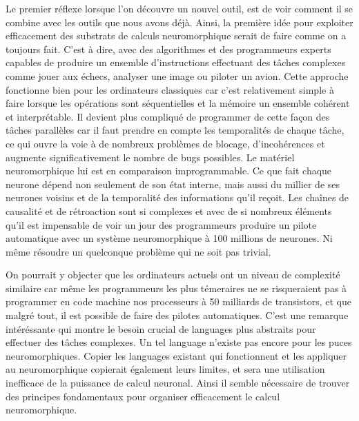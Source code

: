 	Le premier réflexe lorsque l'on découvre un nouvel outil, est de voir comment il se combine avec les outils que nous avons déjà. Ainsi, la première idée pour exploiter efficacement des substrats de calculs neuromorphique serait de faire comme on a toujours fait. C'est à dire, avec des algorithmes et des programmeurs experts capables de produire un ensemble d'instructions effectuant des tâches complexes comme jouer aux échecs, analyser une image ou piloter un avion. Cette approche fonctionne bien pour les ordinateurs classiques car c'est relativement simple à faire lorsque les opérations sont séquentielles et la mémoire un ensemble cohérent et interprétable. Il devient plus compliqué de programmer de cette façon des tâches parallèles car il faut prendre en compte les temporalités de chaque tâche, ce qui ouvre la voie à de nombreux problèmes de blocage, d'incohérences et augmente significativement le nombre de bugs possibles. Le matériel neuromorphique lui est en comparaison improgrammable. Ce que fait chaque neurone dépend non seulement de son état interne, mais aussi du millier de ses neurones voisins et de la temporalité des informations qu'il reçoit. Les chaînes de causalité et de rétroaction sont si complexes et avec de si nombreux éléments qu'il est impensable de voir un jour des programmeurs produire un pilote automatique avec un système neuromorphique à 100 millions de neurones. Ni même résoudre un quelconque problème qui ne soit pas trivial.

	On pourrait y objecter que les ordinateurs actuels ont un niveau de complexité similaire car même les programmeurs les plus témeraires ne se risqueraient pas à programmer en code machine nos processeurs à 50 milliards de transistors, et que malgré tout, il est possible de faire des pilotes automatiques. C'est une remarque intéréssante qui montre le besoin crucial de languages plus abstraits pour effectuer des tâches complexes. Un tel language n'existe pas encore pour les puces neuromorphiques. Copier les languages existant qui fonctionnent et les appliquer au neuromorphique copierait également leurs limites, et sera une utilisation inefficace de la puissance de calcul neuronal. Ainsi il semble nécessaire de trouver des principes fondamentaux pour organiser efficacement le calcul neuromorphique.

